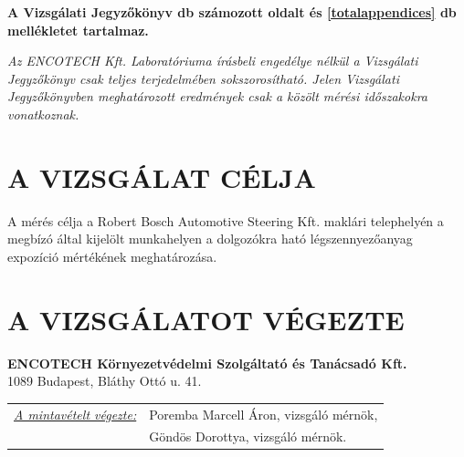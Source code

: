 \documentclass[a4paper,12pt]{article}
\begin{document}
	\begin{center}
		\textbf{A Vizsgálati Jegyzőkönyv \pageref{LastPage} db számozott oldalt és \ref{totalappendices} db mellékletet tartalmaz.}
	\end{center}    
	
	\begin{center}
		{\scriptsize 
			\textit{
				Az ENCOTECH Kft. Laboratóriuma írásbeli engedélye nélkül a Vizsgálati Jegyzőkönyv csak teljes terjedelmében sokszorosítható. 
				Jelen Vizsgálati Jegyzőkönyvben meghatározott eredmények csak a közölt mérési időszakokra vonatkoznak.
		}}  
	\end{center}
	
	\newpage
	

	\tableofcontents
	

	\newpage  %
	\pagestyle{report}
	
	
	\section{A VIZSGÁLAT CÉLJA}
		\begin{adjustwidth}{1cm}{0cm}
			A mérés célja a Robert Bosch Automotive Steering Kft. maklári telephelyén a megbízó által kijelölt munkahelyen a dolgozókra ható légszennyezőanyag expozíció mértékének meghatározása.
		\end{adjustwidth}
	
	
	\section{A VIZSGÁLATOT VÉGEZTE}
		\begin{adjustwidth}{1cm}{0cm}
			\noindent
			\textbf{ENCOTECH Környezetvédelmi Szolgáltató és Tanácsadó Kft.} \\
			1089 Budapest, Bláthy Ottó u. 41.
			
			\vspace{1.0em} %
			
			\noindent
			\begin{tabular}{ p{5.5cm} p{8cm} } 
				\textit{\underline{A mintavételt végezte:}} & Poremba Marcell Áron, vizsgáló mérnök, \\
				& Göndös Dorottya, vizsgáló mérnök.
			\end{tabular}
		\end{adjustwidth}
	
\end{document}
